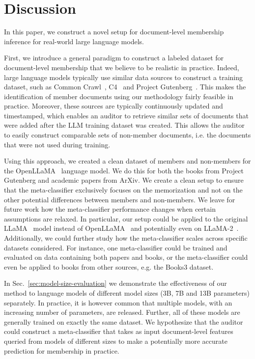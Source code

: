 \documentclass[twocolumn,10pt]{article}
\begin{document}
 

\section{Discussion}
In this paper, we construct a novel setup for document-level membership inference for real-world large language models. 

First, we introduce a general paradigm to construct a labeled dataset for document-level membership that we believe to be realistic in practice. Indeed, large language models typically use similar data sources to construct a training dataset, such as Common Crawl~\cite{commoncrawl}, C4~\cite{raffel2020exploring} and Project Gutenberg~\cite{projectgutenberg}. This makes the identification of member documents using our methodology fairly feasible in practice. Moreover, these sources are typically continuously updated and timestamped, which enables an auditor to retrieve similar sets of documents that were added after the LLM training dataset was created. This allows the auditor to easily construct comparable sets of non-member documents, i.e. the documents that were not used during training. 

Using this approach, we created a clean dataset of members and non-members for the OpenLLaMA~\cite{openlm2023openllama} language model. We do this for both the books from Project Gutenberg and academic papers from ArXiv. We create a clean setup to ensure that the meta-classifier exclusively focuses on the memorization and not on the other potential differences between members and non-members. We leave for future work how the meta-classifier performance changes when certain assumptions are relaxed. In particular, our setup could be applied to the original LLaMA~\cite{touvron2023llama} model instead of OpenLLaMA~\cite{openlm2023openllama} and potentially even on LLaMA-2~\cite{touvron2023llama}. Additionally, we could further study how the meta-classifier scales across specific datasets considered. For instance, one meta-classifier could be trained and evaluated on data containing both papers and books, or the meta-classifier could even be applied to books from other sources, e.g. the Books3 dataset. 

In Sec.~\ref{sec:model-size-evaluation} we demonstrate the effectiveness of our method to language models of different model sizes (3B, 7B and 13B parameters) separately. In practice, it is however common that multiple models, with an increasing number of parameters, are released. Further, all of these models are generally trained on exactly the same dataset. We hypothesize that the auditor could construct a meta-classifier that takes as input document-level features queried from models of different sizes to make a potentially more accurate prediction for membership in practice.
\end{document}
